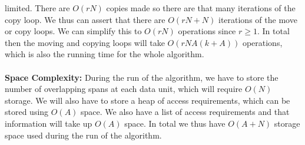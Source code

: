 limited. There are $O(rN)$ copies made so there are that many iterations of the copy loop. We thus
can assert that there are $O(rN + N)$ iterations of the move or copy loops. We can simplify this to $O(rN)$ operations since $r \geq 1$. In total then the moving and copying loops will take
$O(rNA (k + A))$ operations, which is also the running time for the whole algorithm. \\
\\
{\bf Space Complexity:} During the run of the algorithm, we have to store the number of overlapping spans at each data unit, which will require $O(N)$ storage. We will also have to store a heap of access requirements, which can be stored using $O(A)$ space. We also have a list of access requirements and that information will take up $O(A)$ space. In total we thus have $O(A + N)$ storage space used during the run of the algorithm. 
